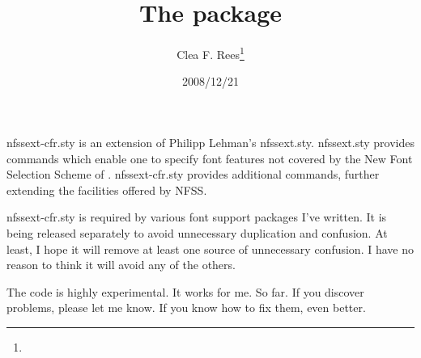 \documentclass[pagesize=auto, fontsize=14pt, DIV=11]{scrartcl}
\title{The \pkg{nfssext-cfr} package}
\author{Clea F. Rees\thanks{\mail{cfrees@imapmail.org}}}
\date{2008/12/21}
\newcommand*{\pkg}[1]{\mbox{\textsf{#1}}}
\begin{document}
\maketitle

\noindent
\pkg{nfssext-cfr.sty} is an extension of Philipp Lehman's \pkg{nfssext.sty}\@. \pkg{nfssext.sty} provides commands which enable one to specify font features not covered by the New Font Selection Scheme of \LaTeXe\@. \pkg{nfssext-cfr.sty} provides additional commands, further extending the facilities offered by NFSS.

\pkg{nfssext-cfr.sty} is required by various font support packages I've written. It is being released separately to avoid unnecessary duplication and confusion. At least, I hope it will remove at least one source of unnecessary confusion. I have no reason to think it will avoid any of the others.

The code is highly experimental. It works for me. So far. If you discover problems, please let me know. If you know how to fix them, even better.
\end{document}
